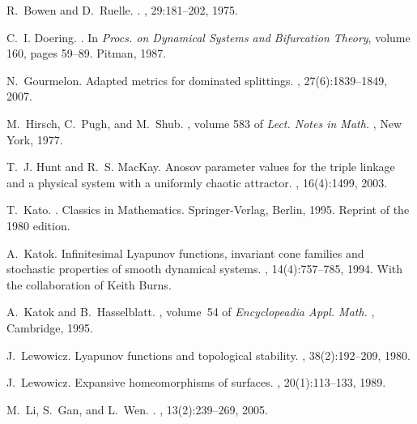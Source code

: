 \documentclass[12pt,reqno]{amsart}
\numberwithin{equation}{section}
\theoremstyle{plain}
\theoremstyle{definition}
\begin{document}
\begin{thebibliography}{10}
R.~Bowen and D.~Ruelle.
.
, {29}:{181--202}, {1975}.

C.~I. Doering.
.
\newblock In {\em {Procs. on Dynamical Systems and Bifurcation Theory}}, volume
  {160}, pages {59--89}. {Pitman}, {1987}.

N.~Gourmelon.
\newblock Adapted metrics for dominated splittings.
, 27(6):1839--1849, 2007.

M.~Hirsch, C.~Pugh, and M.~Shub.
, volume {583} of {\em {Lect. Notes in
  Math.}}
, {New York}, {1977}.

T.~J. Hunt and R.~S. MacKay.
\newblock Anosov parameter values for the triple linkage and a physical system
  with a uniformly chaotic attractor.
, 16(4):1499, 2003.

T.~Kato.
.
\newblock Classics in Mathematics. Springer-Verlag, Berlin, 1995.
\newblock Reprint of the 1980 edition.

A.~Katok.
\newblock Infinitesimal {L}yapunov functions, invariant cone families and
  stochastic properties of smooth dynamical systems.
, 14(4):757--785, 1994.
\newblock With the collaboration of Keith Burns.

A.~Katok and B.~Hasselblatt.
,
  volume~{54} of {\em {Encyclopeadia Appl. Math.}}
, {Cambridge}, {1995}.

J.~Lewowicz.
\newblock Lyapunov functions and topological stability.
, 38(2):192--209, 1980.

J.~Lewowicz.
\newblock Expansive homeomorphisms of surfaces.
, 20(1):113--133, 1989.

M.~Li, S.~Gan, and L.~Wen.
.
, {13}({2}):{239--269}, {2005}.


\end{thebibliography}
\end{document}
